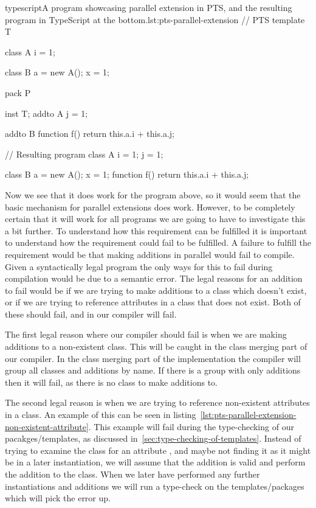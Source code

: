 \begin{code}{typescript}{A program showcasing parallel extension in PTS, and the resulting program in TypeScript at the bottom.}{lst:pts-parallel-extension}
    // PTS
    template T {
        class A {
            i = 1;
        }

        class B {
            a = new A();
            x = 1;
        }
    }

    pack P {
        inst T;
        addto A {
            j = 1;
        }

        addto B {
            function f() {
                return this.a.i + this.a.j;
            }
        }
    }

    // Resulting program
    class A {
        i = 1;
        j = 1;
    }

    class B {
        a = new A();
        x = 1;
        function f() {
            return this.a.i + this.a.j;
        }
    }
\end{code}

Now we see that it does work for the program above, so it would seem that the basic mechanism for parallel extensions does work.
However, to be completely certain that it will work for all programs we are going to have to investigate this a bit further.
To understand how this requirement can be fulfilled it is important to understand how the requirement could fail to be fulfilled.
A failure to fulfill the requirement would be that making additions in parallel would fail to compile.
Given a syntactically legal program the only ways for this to fail during compilation would be due to a semantic error.
The legal reasons for an addition to fail would be if we are trying to make additions to a class which doesn't exist, or if we are trying to reference attributes in a class that does not exist.
Both of these should fail, and in our compiler will fail.

The first legal reason where our compiler should fail is when we are making additions to a non-existent class.
This will be caught in the class merging part of our compiler.
In the class merging part of the implementation the compiler will group all classes and additions by name.
If there is a group with only additions then it will fail, as there is no class to make additions to.

The second legal reason is when we are trying to reference non-existent attributes in a class.
An example of this can be seen in listing~\vref{lst:pts-parallel-extension-non-existent-attribute}.
This example will fail during the type-checking of our pacakges/templates, as discussed in~\vref{sec:type-checking-of-templates}.
Instead of trying to examine the class  for an attribute , and maybe not finding it as it might be in a later instantiation, we will assume that the addition is valid and perform the addition to the class.
When we later have performed any further instantiations and additions we will run a type-check on the templates/packages which will pick the error up.

